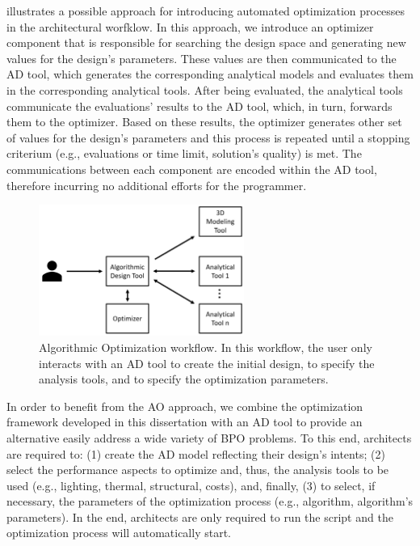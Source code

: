  illustrates a possible approach for introducing automated optimization processes in the architectural worfklow. In this approach, we introduce an optimizer component that is responsible for searching the design space and generating new values for the design's parameters. These values are then communicated to the \ac{AD} tool, which generates the corresponding analytical models and evaluates them in the corresponding analytical tools. After being evaluated, the analytical tools communicate the evaluations' results to the \ac{AD} tool, which, in turn, forwards them to the optimizer. Based on these results, the optimizer generates other set of values for the design's parameters and this process is repeated until a stopping criterium (e.g., evaluations or time limit, solution's quality) is met. The communications between each component are encoded within the \ac{AD} tool, therefore incurring no additional efforts for the programmer.
 
 \begin{figure}[htbp]
 	\centering
 	\includegraphics[width=0.6\textwidth]{./Images/Solution/algorithmic_optimization.png}
 	\caption{Algorithmic Optimization workflow. In this workflow, the user only interacts with an \ac{AD} tool to create the initial design, to specify the analysis tools, and to specify the optimization parameters.}
 	\label{fig:algorithmicoptimization}
 \end{figure}
 
In order to benefit from the \ac{AO} approach, we combine the optimization framework developed in this dissertation with an \ac{AD} tool to provide an alternative easily address a wide variety of \ac{BPO} problems. To this end, architects are required to: (1) create the \ac{AD} model reflecting their design's intents; (2) select the performance aspects to optimize and, thus, the analysis tools to be used (e.g., lighting, thermal, structural, costs), and, finally, (3) to select, if necessary, the parameters of the optimization process (e.g., algorithm, algorithm's parameters). In the end, architects are only required to run the script and the optimization process will automatically start.

